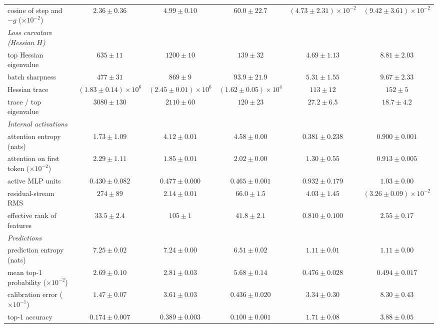 \begin{center}
\begin{minipage}{\linewidth}
\begin{tabular}{@{}l|ccc|cc@{}}
cosine of step and $-g$ ($\times10^{-2}$) & $2.36 \pm 0.36$ & $4.99 \pm 0.10$ & $60.0 \pm 22.7$ & {\boldmath\textbf{$(4.73 \pm 2.31){\times}10^{-2}$}} & $(9.42 \pm 3.61){\times}10^{-2}$ \\
\emph{Loss curvature (Hessian $H$)} & & & & & \\
top Hessian eigenvalue & $635 \pm 11$ & $1200 \pm 10$ & $139 \pm 32$ & $4.69 \pm 1.13$ & $8.81 \pm 2.03$ \\
batch sharpness & $477 \pm 31$ & $869 \pm 9$ & $93.9 \pm 21.9$ & $5.31 \pm 1.55$ & $9.67 \pm 2.33$ \\
Hessian trace & $(1.83 \pm 0.14){\times}10^{6}$ & $(2.45 \pm 0.01){\times}10^{6}$ & $(1.62 \pm 0.05){\times}10^{4}$ & {\boldmath\textbf{$113 \pm 12$}} & {\boldmath\textbf{$152 \pm 5$}} \\
trace / top eigenvalue & $3080 \pm 130$ & $2110 \pm 60$ & $120 \pm 23$ & {\boldmath\textbf{$27.2 \pm 6.5$}} & {\boldmath\textbf{$18.7 \pm 4.2$}} \\
\emph{Internal activations} & & & & & \\
attention entropy (nats) & $1.73 \pm 1.09$ & $4.12 \pm 0.01$ & $4.58 \pm 0.00$ & $0.381 \pm 0.238$ & $0.900 \pm 0.001$ \\
attention on first token ($\times10^{-2}$) & $2.29 \pm 1.11$ & $1.85 \pm 0.01$ & $2.02 \pm 0.00$ & $1.30 \pm 0.55$ & $0.913 \pm 0.005$ \\
active MLP units & $0.430 \pm 0.082$ & $0.477 \pm 0.000$ & $0.465 \pm 0.001$ & $0.932 \pm 0.179$ & $1.03 \pm 0.00$ \\
residual-stream RMS & $274 \pm 89$ & $2.14 \pm 0.01$ & $66.0 \pm 1.5$ & $4.03 \pm 1.45$ & {\boldmath\textbf{$(3.26 \pm 0.09){\times}10^{-2}$}} \\
effective rank of features & $33.5 \pm 2.4$ & $105 \pm 1$ & $41.8 \pm 2.1$ & $0.810 \pm 0.100$ & $2.55 \pm 0.17$ \\
\emph{Predictions} & & & & & \\
prediction entropy (nats) & $7.25 \pm 0.02$ & $7.24 \pm 0.00$ & $6.51 \pm 0.02$ & $1.11 \pm 0.01$ & $1.11 \pm 0.00$ \\
mean top-1 probability ($\times10^{-2}$) & $2.69 \pm 0.10$ & $2.81 \pm 0.03$ & $5.68 \pm 0.14$ & $0.476 \pm 0.028$ & $0.494 \pm 0.017$ \\
calibration error ($\times10^{-1}$) & $1.47 \pm 0.07$ & $3.61 \pm 0.03$ & $0.436 \pm 0.020$ & $3.34 \pm 0.30$ & $8.30 \pm 0.43$ \\
top-1 accuracy & $0.174 \pm 0.007$ & $0.389 \pm 0.003$ & $0.100 \pm 0.001$ & $1.71 \pm 0.08$ & $3.88 \pm 0.05$ \\

\end{tabular}
\end{minipage}
\end{center}
